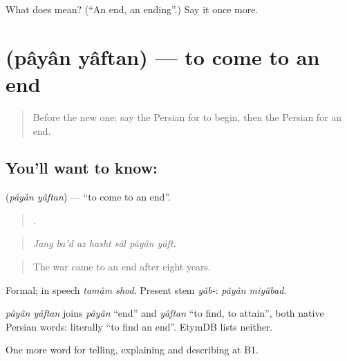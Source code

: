 \begin{tcolorbox}[breakable,colback=teal!4,colframe=teal!35!black,title={Before you move on}]
What does  mean? (\textquotedblleft{}An end, an ending\textquotedblright{}.) Say it once more.
\end{tcolorbox}
\section[\texorpdfstring{\fa{پایان} \fa{یافتن} (pâyân yâftan)}{پایان یافتن (pâyân yâftan)}]{  (pâyân yâftan) — to come to an end}

\label{lesson:FA-C302-payan-yaftan}



\begin{quote}
Before the new one: say the Persian for to begin, then the Persian for an end.
\end{quote}

\subsection*{You'll want to know:  }
\textbf{ } (\emph{pâyân yâftan}) — \textquotedblleft{}to come to an end\textquotedblright{}.

\begin{quote}
      .
\end{quote}

\begin{quote}
\emph{Jang ba'd az hasht sâl pâyân yâft.}
\end{quote}

\begin{quote}
The war came to an end after eight years.
\end{quote}

Formal; in speech \emph{tamâm shod}. Present stem \emph{yâb-}: \emph{pâyân miyâbad}.

\begin{cousinweb}
\emph{pâyân yâftan} joins \emph{pâyân} \textquotedblleft{}end\textquotedblright{} and \emph{yâftan} \textquotedblleft{}to find, to attain\textquotedblright{}, both native Persian words: literally \textquotedblleft{}to find an end\textquotedblright{}. EtymDB lists neither.
\end{cousinweb}

\begin{grammarlens}[title={What you've built}]
One more word for telling, explaining and describing at B1.
\end{grammarlens}

